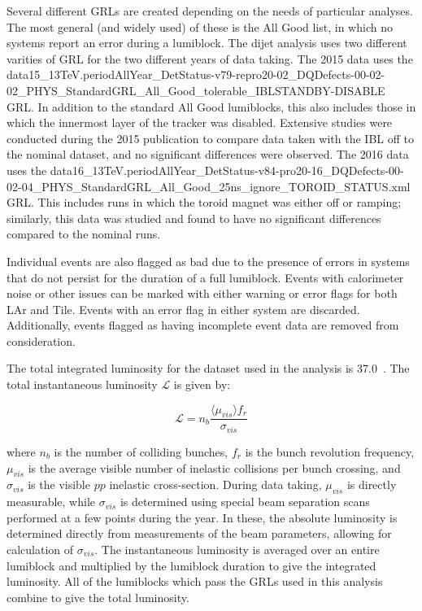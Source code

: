 Several different GRLs are created depending on the needs of particular analyses.  The most general (and widely used) of these is the All Good list, in which no systems report an error during a lumiblock.  The dijet analysis uses two different varities of GRL for the two different years of data taking.  The 2015 data uses the  data15\_13TeV.periodAllYear\_DetStatus-v79-repro20-02\_DQDefects-00-02-02\_PHYS\_StandardGRL\_All\_Good\_tolerable\_IBLSTANDBY-DISABLE GRL.  In addition to the standard All Good lumiblocks, this also includes those in which the innermost layer of the tracker was disabled.  Extensive studies were conducted during the 2015 publication to compare data taken with the IBL off to the nominal dataset, and no significant differences were observed.  The 2016 data uses the data16\_13TeV.periodAllYear\_DetStatus-v84-pro20-16\_DQDefects-00-02-04\_PHYS\_StandardGRL\_All\_Good\_25ns\_ignore\_TOROID\_STATUS.xml GRL.  This includes runs in which the toroid magnet was either off or ramping; similarly, this data was studied and found to have no significant differences compared to the nominal runs.

Individual events are also flagged as bad due to the presence of errors in systems that do not persist for the duration of a full lumiblock.  Events with calorimeter noise or other issues can be marked with either warning or error flags for both LAr and Tile.  Events with an error flag in either system are discarded.  Additionally, events flagged as having incomplete event data are removed from consideration.

The total integrated luminosity for the dataset used in the analysis is 37.0~\ifb.  The total instantaneous luminosity $\mathcal{L}$ is given by:

\begin{equation}
\mathcal{L} = n_b \frac{\langle\mu_{vis}\rangle f_r}{\sigma_{vis}}
\end{equation} 

where $n_b$ is the number of colliding bunches, $f_r$ is the bunch revolution frequency, $\mu_{vis}$ is the average visible number of inelastic collisions per bunch crossing, and $\sigma_{vis}$ is the visible $pp$ inelastic cross-section.\cite{Luminosity}  During data taking, $\mu_{vis}$ is directly measurable, while $\sigma_{vis}$ is determined using special beam separation scans performed at a few points during the year.  In these, the absolute luminosity is determined directly from measurements of the beam parameters, allowing for calculation of $\sigma_{vis}$.  The instantaneous luminosity is averaged over an entire lumiblock and multiplied by the lumiblock duration to give the integrated luminosity.  All of the lumiblocks which pass the GRLs used in this analysis combine to give the total luminosity.

